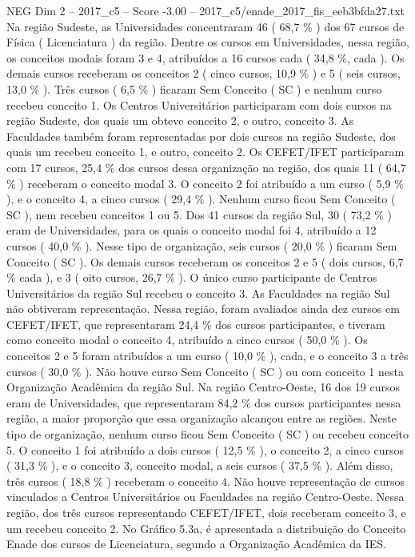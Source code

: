\begin{textsample}{NEG Dim 2 – 2017\_c5 – Score -3.00 – 2017\_c5/enade\_2017\_fis\_eeb3bfda27.txt}
Na região Sudeste, as Universidades concentraram 46 ( 68,7 \% ) dos 67 cursos de Física ( Licenciatura ) da região.
Dentre os cursos em Universidades, nessa região, os conceitos modais foram 3 e 4, atribuídos a 16 cursos cada ( 34,8 \%, cada ).
Os demais cursos receberam os conceitos 2 ( cinco cursos, 10,9 \% ) e 5 ( seis cursos, 13,0 \% ).
Três cursos ( 6,5 \% ) ficaram Sem Conceito ( SC ) e nenhum curso recebeu conceito 1.
Os Centros Universitários participaram com dois cursos na região Sudeste, dos quais um obteve conceito 2, e outro, conceito 3.
As Faculdades também foram representadas por dois cursos na região Sudeste, dos quais um recebeu conceito 1, e outro, conceito 2.
Os CEFET/IFET participaram com 17 cursos, 25,4 \% dos cursos dessa organização na região, dos quais 11 ( 64,7 \% ) receberam o conceito modal 3.
O conceito 2 foi atribuído a um curso ( 5,9 \% ), e o conceito 4, a cinco cursos ( 29,4 \% ).
Nenhum curso ficou Sem Conceito ( SC ), nem recebeu conceitos 1 ou 5.
Dos 41 cursos da região Sul, 30 ( 73,2 \% ) eram de Universidades, para os quais o conceito modal foi 4, atribuído a 12 cursos ( 40,0 \% ).
Nesse tipo de organização, seis cursos ( 20,0 \% ) ficaram Sem Conceito ( SC ).
Os demais cursos receberam os conceitos 2 e 5 ( dois cursos, 6,7 \% cada ), e 3 ( oito cursos, 26,7 \% ).
O único curso participante de Centros Universitários da região Sul recebeu o conceito 3.
As Faculdades na região Sul não obtiveram representação.
Nessa região, foram avaliados ainda dez cursos em CEFET/IFET, que representaram 24,4 \% dos cursos participantes, e tiveram como conceito modal o conceito 4, atribuído a cinco cursos ( 50,0 \% ).
Os conceitos 2 e 5 foram atribuídos a um curso ( 10,0 \% ), cada, e o conceito 3 a três cursos ( 30,0 \% ).
Não houve curso Sem Conceito ( SC ) ou com conceito 1 nesta Organização Acadêmica da região Sul.
Na região Centro-Oeste, 16 dos 19 cursos eram de Universidades, que representaram 84,2 \% dos cursos participantes nessa região, a maior proporção que essa organização alcançou entre as regiões.
Neste tipo de organização, nenhum curso ficou Sem Conceito ( SC ) ou recebeu conceito 5.
O conceito 1 foi atribuído a dois cursos ( 12,5 \% ), o conceito 2, a cinco cursos ( 31,3 \% ), e o conceito 3, conceito modal, a seis cursos ( 37,5 \% ).
Além disso, três cursos ( 18,8 \% ) receberam o conceito 4.
Não houve representação de cursos vinculados a Centros Universitários ou Faculdades na região Centro-Oeste.
Nessa região, dos três cursos representando CEFET/IFET, dois receberam conceito 3, e um recebeu conceito 2.
No Gráfico 5.3a, é apresentada a distribuição do Conceito Enade dos cursos de Licenciatura, segundo a Organização Acadêmica da IES.

\end{textsample}
